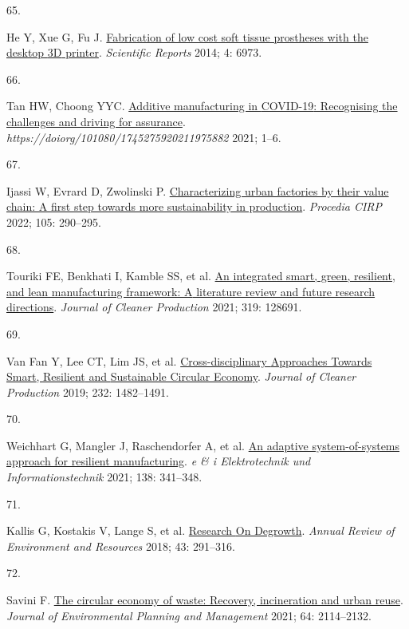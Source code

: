 \documentclass[
  12pt,
  a4paperpaper,
  onecolumn]{article}
\newlength{\cslhangindent}
\newlength{\csllabelwidth}
\newlength{\cslentryspacingunit} %
\newenvironment{CSLReferences}[2] %
 {%
  \setlength{\parindent}{0pt}
  \ifodd #1
  \let\oldpar\par
  \def\par{\hangindent=\cslhangindent\oldpar}
  \fi
  \setlength{\parskip}{#2\cslentryspacingunit}
 }%
 {}
\newcommand{\CSLLeftMargin}[1]{\parbox[t]{\csllabelwidth}{#1}}
\newcommand{\CSLRightInline}[1]{\parbox[t]{\linewidth - \csllabelwidth}{#1}\break}
\begin{document}
\begin{CSLReferences}{0}{0}
\leavevmode{}%
\CSLLeftMargin{65. }%
\CSLRightInline{He Y, Xue G, Fu J.
\href{https://doi.org/10.1038/srep06973}{Fabrication of low cost soft
tissue prostheses with the desktop {3D} printer}. \emph{Scientific
Reports} 2014; 4: 6973.}

\leavevmode{}%
\CSLLeftMargin{66. }%
\CSLRightInline{Tan HW, Choong YYC.
\href{https://doi.org/10.1080/17452759.2021.1975882}{Additive
manufacturing in {COVID-19}: Recognising the challenges and driving for
assurance}. \emph{https://doiorg/101080/1745275920211975882} 2021;
1--6.}

\leavevmode{}%
\CSLLeftMargin{67. }%
\CSLRightInline{Ijassi W, Evrard D, Zwolinski P.
\href{https://doi.org/10.1016/j.procir.2022.02.048}{Characterizing urban
factories by their value chain: A first step towards more sustainability
in production}. \emph{Procedia CIRP} 2022; 105: 290--295.}

\leavevmode{}%
\CSLLeftMargin{68. }%
\CSLRightInline{Touriki FE, Benkhati I, Kamble SS, et al.
\href{https://doi.org/10.1016/J.JCLEPRO.2021.128691}{An integrated
smart, green, resilient, and lean manufacturing framework: {A}
literature review and future research directions}. \emph{Journal of
Cleaner Production} 2021; 319: 128691.}

\leavevmode{}%
\CSLLeftMargin{69. }%
\CSLRightInline{Van Fan Y, Lee CT, Lim JS, et al.
\href{https://doi.org/10.1016/j.jclepro.2019.05.266}{Cross-disciplinary
{Approaches Towards Smart}, {Resilient} and {Sustainable Circular
Economy}}. \emph{Journal of Cleaner Production} 2019; 232: 1482--1491.}

\leavevmode{}%
\CSLLeftMargin{70. }%
\CSLRightInline{Weichhart G, Mangler J, Raschendorfer A, et al.
\href{https://doi.org/10.1007/s00502-021-00912-2}{An adaptive
system-of-systems approach for resilient manufacturing}. \emph{e \& i
Elektrotechnik und Informationstechnik} 2021; 138: 341--348.}

\leavevmode{}%
\CSLLeftMargin{71. }%
\CSLRightInline{Kallis G, Kostakis V, Lange S, et al.
\href{https://doi.org/10.1146/annurev-environ-102017-025941}{Research
{On Degrowth}}. \emph{Annual Review of Environment and Resources} 2018;
43: 291--316.}

\leavevmode{}%
\CSLLeftMargin{72. }%
\CSLRightInline{Savini F.
\href{https://doi.org/10.1080/09640568.2020.1857226}{The circular
economy of waste: Recovery, incineration and urban reuse}. \emph{Journal
of Environmental Planning and Management} 2021; 64: 2114--2132.}


\end{CSLReferences}
\end{document}
